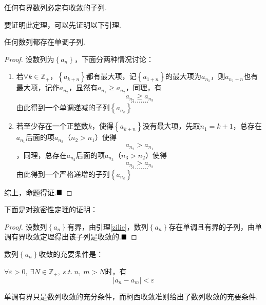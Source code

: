 \begin{theorem}[致密性定理]
	任何有界数列必定有收敛的子列.
\end{theorem}
要证明此定理，可以先证明以下引理.
\begin{lemma}\label{zilie}
	任何数列都存在单调子列.
\end{lemma}
\begin{proof}
	设数列为$\left\{a_n\right\}$，下面分两种情况讨论：
	\begin{enumerate}
		\item 若$\forall k\in \mathbb{Z}_+$，$\left\{a_{k+n}\right\}$都有最大项，记$\left\{a_{1+n}\right\}$的最大项为$a_{n_1}$，则$a_{{n_1}+n}$也有最大项，记作$a_{n_2}$，显然有$a_{n_1}\geqslant a_{n_2}$，同理，有$$a_{n_2}\geqslant a_{n_3}$$
		$$.........$$
		由此得到一个单调递减的子列$\left\{a_{n_k}\right\}$
		\item 若至少存在一个正整数$k$，使得$\left\{a_{k+n}\right\}$没有最大项，先取$n_1=k+1$，总存在$a_{n_1}$后面的项$a_{n_2}$（$n_2>n_1$）使得$$a_{n_2}>a_{n_1}$$，同理，总存在$a_{n_2}$后面的项$a_{n_3}$（$n_3>n_2$）使得$$a_{n_3}>a_{n_2}$$
		$$.........$$
		由此得到一个严格递增的子列$\left\{a_{n_k}\right\}$
	\end{enumerate}
	
	综上，命题得证.$\hfill\blacksquare$
\end{proof}
下面是对致密性定理的证明：
\begin{proof}
	设数列$\left\{a_n\right\}$有界，由引理\ref{zilie}，数列$\left\{a_n\right\}$存在单调且有界的子列，由单调有界收敛定理得出该子列是收敛的.$\hfill\blacksquare$
\end{proof}
\begin{theorem}
	数列$\left\{a_n\right\}$收敛的充要条件是：\par 
	$\forall \varepsilon>0,\ \exists N\in \mathbb{Z}_+,\ s.t.\ n,\ m>N$时，有
	$$\lvert a_n - a_m \rvert<\varepsilon$$
\end{theorem}
单调有界只是数列收敛的充分条件，而柯西收敛准则给出了数列收敛的充要条件.
